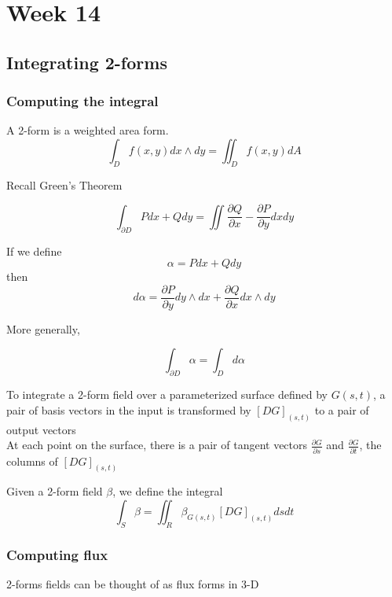 \chapter{Week 14}

\section{Integrating 2-forms}

\subsection{Computing the integral}
\begin{framed}
A 2-form is a weighted area form.
\[
   \int_{D}^{} f(x, y)  dx \wedge dy = \iint_{D} f(x, y) dA 
\] 
\end{framed}

Recall Green's Theorem

\[
  \int_{\partial D}^{} Pdx + Q dy = \iint \frac{\partial Q}{\partial x} - \frac{\partial P}{\partial y} dx dy 
\] 

If we define
\[
  \alpha = Pdx + Q dy 
\] 
then
\[
  d\alpha = \frac{\partial P}{\partial y} dy\wedge dx + \frac{\partial Q}{\partial x} dx \wedge dy 
\] 

More generally,

\[
  \int_{\partial D}^{}  \alpha = \int_{D}^{} d \alpha  
\] 

To integrate a 2-form field over a parameterized surface defined by $G(s, t)$, a pair of basis vectors in the input is transformed by  $\left[ D G \right]_{(s, t)} $ to a pair of output vectors \\

At each point on the surface, there is a pair of tangent vectors $ \frac{\partial G}{\partial s} $ and $\frac{\partial G}{\partial t}$, the columns of $\left[ D G \right]_{(s, t)} $

\begin{framed}
Given a 2-form field $\beta$, we define the integral
\[
   \int_{S}^{} \beta = \iint_R \beta_{G(s, t)}  \left[ D G \right]_{(s, t)}   ds dt
\] 
\end{framed}

\subsection{Computing flux}

2-forms fields can be thought of as flux forms in 3-D \\

